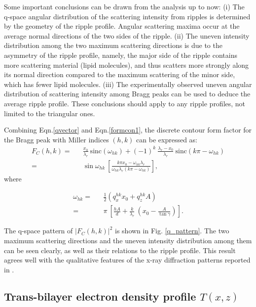 Some important conclusions can be drawn from the analysis up to now:
(i) The q-space angular distribution of the scattering intensity from 
ripples is 
determined by the geometry of the ripple profile. Angular scattering maxima
occur at the average normal directions of the two sides of the ripple.
(ii) The uneven intensity distribution among the two maximum scattering
directions is due to the asymmetry of the ripple 
profile, namely, the major side of the ripple contains more scattering
material (lipid molecules), and thus scatters more strongly along its normal 
direction compared to the maximum scattering of the minor side, which 
has fewer lipid molecules. (iii) The experimentally observed uneven angular 
distribution of 
scattering intensity among Bragg peaks \cite{Ale85,Wac89a,Kat95} can be used 
to deduce the average ripple profile. These conclusions should apply to any 
ripple profiles, not limited to the triangular ones. 

Combining Eqn.\ref{qvector} and Eqn.\ref{formcon1}, the discrete contour form
factor for the Bragg peak with Miller indices $(h,k)$ can be expressed as:
\begin{eqnarray}
\label{discrete}
F_C(h,k) =&& \frac{x_0}{\lambda_r}\ \mbox{sinc}
(\omega_{hk}) + (-1)^k\ \frac{\lambda_r - x_0}{\lambda_r}\ 
\mbox{sinc}(k \pi - \omega_{hk})\nonumber\\
=&& \sin \omega_{hk}\ \left[\frac{k \pi x_0 - 
\omega_{hk} \lambda_r}{\omega_{hk} \lambda_r (k \pi - \omega_{hk})} \right],
\end{eqnarray}
where

\begin{eqnarray}
\label{whk}
\omega_{hk} =&& \frac{1}{2} (q_x^{hk} x_0 + q_z^{hk} A)\nonumber\\
=&& \pi\ \left[ \frac{h A}{d} + \frac{k}{\lambda_r}\ (x_0 -
\frac{A}{\tan \gamma}) \right].
\end{eqnarray}

The q-space pattern of $|F_C(h,k)|^2$ is shown in Fig. \ref{q_pattern}. 
The two maximum scattering 
directions and the uneven intensity distribution among them can be seen 
clearly, as well as their
relations to the ripple profile. This result agrees well with the qualitative 
features of the x-ray diffraction patterns reported in 
\cite{Ale85,Wac89a,Kat95}. 

\subsection{Trans-bilayer electron density profile $T(x,z)$}

